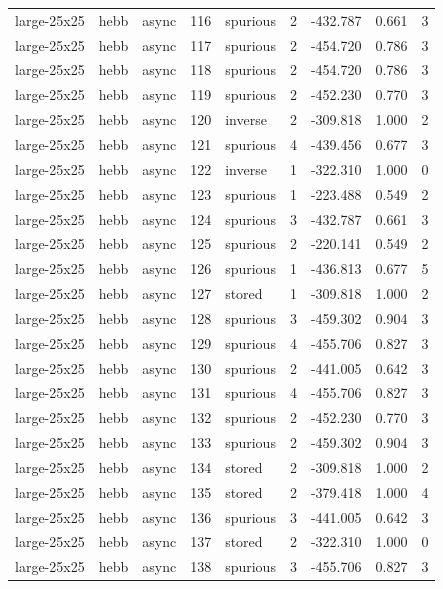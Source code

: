\begin{tabular}{lllrlrrrr}
large-25x25 & hebb & async & 116 & spurious & 2 & -432.787 & 0.661 & 3 \\
large-25x25 & hebb & async & 117 & spurious & 2 & -454.720 & 0.786 & 3 \\
large-25x25 & hebb & async & 118 & spurious & 2 & -454.720 & 0.786 & 3 \\
large-25x25 & hebb & async & 119 & spurious & 2 & -452.230 & 0.770 & 3 \\
large-25x25 & hebb & async & 120 & inverse & 2 & -309.818 & 1.000 & 2 \\
large-25x25 & hebb & async & 121 & spurious & 4 & -439.456 & 0.677 & 3 \\
large-25x25 & hebb & async & 122 & inverse & 1 & -322.310 & 1.000 & 0 \\
large-25x25 & hebb & async & 123 & spurious & 1 & -223.488 & 0.549 & 2 \\
large-25x25 & hebb & async & 124 & spurious & 3 & -432.787 & 0.661 & 3 \\
large-25x25 & hebb & async & 125 & spurious & 2 & -220.141 & 0.549 & 2 \\
large-25x25 & hebb & async & 126 & spurious & 1 & -436.813 & 0.677 & 5 \\
large-25x25 & hebb & async & 127 & stored & 1 & -309.818 & 1.000 & 2 \\
large-25x25 & hebb & async & 128 & spurious & 3 & -459.302 & 0.904 & 3 \\
large-25x25 & hebb & async & 129 & spurious & 4 & -455.706 & 0.827 & 3 \\
large-25x25 & hebb & async & 130 & spurious & 2 & -441.005 & 0.642 & 3 \\
large-25x25 & hebb & async & 131 & spurious & 4 & -455.706 & 0.827 & 3 \\
large-25x25 & hebb & async & 132 & spurious & 2 & -452.230 & 0.770 & 3 \\
large-25x25 & hebb & async & 133 & spurious & 2 & -459.302 & 0.904 & 3 \\
large-25x25 & hebb & async & 134 & stored & 2 & -309.818 & 1.000 & 2 \\
large-25x25 & hebb & async & 135 & stored & 2 & -379.418 & 1.000 & 4 \\
large-25x25 & hebb & async & 136 & spurious & 3 & -441.005 & 0.642 & 3 \\
large-25x25 & hebb & async & 137 & stored & 2 & -322.310 & 1.000 & 0 \\
large-25x25 & hebb & async & 138 & spurious & 3 & -455.706 & 0.827 & 3 \\

\end{tabular}
